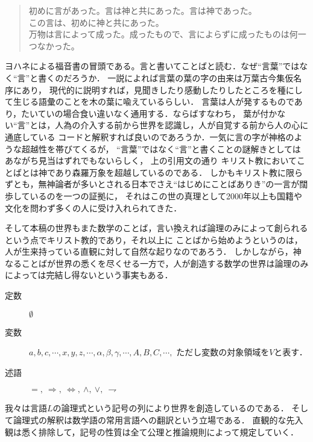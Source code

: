 	\begin{quote}
		初めに言があった。言は神と共にあった。言は神であった。\\
		この言は、初めに神と共にあった。\\
		万物は言によって成った。成ったもので、言によらずに成ったものは何一つなかった。
	\end{quote}
	ヨハネによる福音書の冒頭である。言と書いてことばと読む．なぜ``言葉''ではなく``言''と書くのだろうか．
	一説によれば言葉の葉の字の由来は万葉古今集仮名序にあり，
	現代的に説明すれば，見聞きしたり感動したりしたところを種にして生じる語彙のことを木の葉に喩えているらしい．
	言葉は人が発するものであり，たいていの場合食い違いなく通用する．ならばすなわち，
	葉が付かない``言''とは，人為の介入する前から世界を認識し，人が自覚する前から人の心に通底している
	コードと解釈すれば良いのであろうか．一気に言の字が神格のような超越性を帯びてくるが，
	``言葉''ではなく``言''と書くことの謎解きとしてはあながち見当はずれでもないらしく，
	上の引用文の通り%
	キリスト教においてことばとは神であり森羅万象を超越しているのである．
	しかもキリスト教に限らずとも，無神論者が多いとされる日本でさえ``はじめにことばありき''の一言が闊歩しているのを一つの証拠に，
	それはこの世の真理として2000年以上も国籍や文化を問わず多くの人に受け入れられてきた．
	\begin{comment}
		実際に自然言語の発生が事物の観測なしに起こり得たかという問題は言語哲学上も決着がついていないらしいが，
		少なくとも
	\end{comment}
	そして本稿の世界もまた数学のことば，言い換えれば論理のみによって創られるという点でキリスト教的であり，それ以上に
	ことばから始めようというのは，人が生来持っている直観に対して自然な起りなのであろう．
	しかしながら，神なることばが世界の悉くを尽くせる一方で，人が創造する数学の世界は論理のみによっては完結し得ないという事実もある．
	
	
	\begin{description}
		\item[定数] $\emptyset$
		\item[変数] $a,b,c,\cdots,x,y,z,\cdots,\alpha,\beta,\gamma,\cdots,A,B,C,\cdots,$
			ただし変数の対象領域を$V$と表す．
		\item[述語] $=,\ \Longrightarrow,\ \Longleftrightarrow,
			\ \wedge,\ \vee,\ \rightharpoondown$
	\end{description}
	
	我々は言語$L$の論理式という記号の列により世界を創造しているのである．
	そして論理式の解釈は数学語の常用言語への翻訳という立場である．
	直観的な先入観は悉く排除して，記号の性質は全て公理と推論規則によって規定していく．
	
